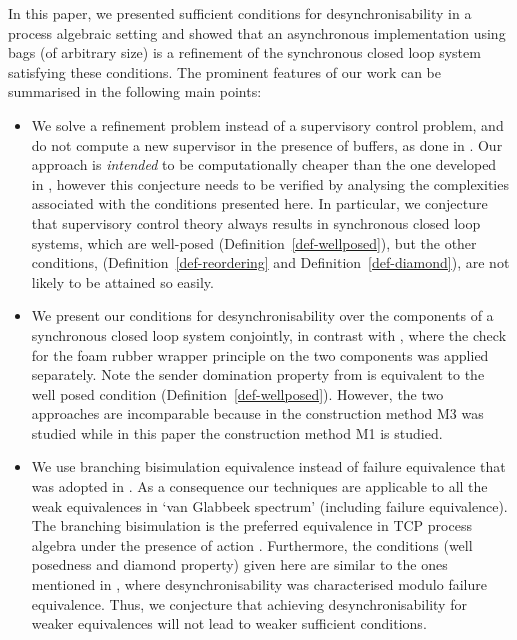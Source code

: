 \documentclass[copyright]{eptcs}
\theoremstyle{plain}
\theoremstyle{definition}
\begin{document}
In this paper, we presented sufficient conditions for desynchronisability in a process algebraic setting and showed that an asynchronous implementation using bags (of arbitrary size) is a refinement of the synchronous closed loop system satisfying these conditions.
The prominent features of our work can be summarised in the following main points:
\begin{itemize}
\item We solve a refinement problem instead of a supervisory control problem, and do not compute a new supervisor in the presence of buffers, as done in \citep{balemiphdt,async-imp}. Our approach is \textit{intended} to be computationally cheaper than the one developed in \citep{balemiphdt,async-imp}, however this conjecture needs to be verified by analysing the complexities associated with the conditions presented here. In particular, we conjecture that supervisory control theory always results in synchronous closed loop systems, which are well-posed (Definition~\ref{def-wellposed}), but the other conditions, (Definition~\ref{def-reordering} and Definition~\ref{def-diamond}), are not likely to be attained so easily.
\item We present our conditions for desynchronisability over the components of a synchronous closed loop system conjointly, in contrast with \citep{Fischer96}, where the check for the foam rubber wrapper principle on the two components was applied separately. Note the sender domination property from \citep{Fischer96} is equivalent to the well posed condition (Definition~\ref{def-wellposed}). However, the two approaches are incomparable because in \citep{Fischer96} the construction method M3 was studied while in this paper the construction method M1 is studied.
\item We use branching bisimulation equivalence instead of failure equivalence that was adopted in \citep{Fischer96}. As a consequence our techniques are applicable to all the weak equivalences in `van Glabbeek spectrum' \citep{Glabeek90} (including failure equivalence). The branching bisimulation is the preferred equivalence in TCP process algebra under the presence of  action \citep{acpbook}. Furthermore, the conditions (well posedness and diamond property) given here are similar to the ones mentioned in \citep{Fischer96}, where desynchronisability was characterised modulo failure equivalence. Thus, we conjecture that achieving desynchronisability for weaker equivalences will not lead to weaker sufficient conditions.
\end{itemize}
\end{document}
